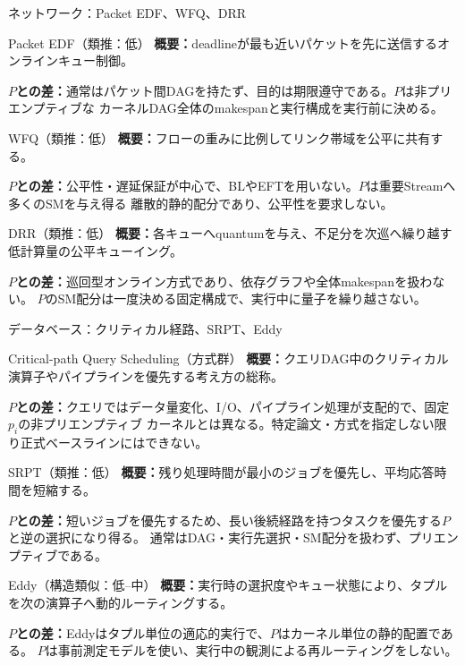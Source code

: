 \documentclass[aspectratio=169,10pt]{beamer}
\begin{document}
\begin{frame}{ネットワーク：Packet EDF、WFQ、DRR}
  \scriptsize
  \begin{block}{Packet EDF（類推：低）}
    \textbf{概要：}deadlineが最も近いパケットを先に送信するオンラインキュー制御。\par
    \textbf{$P$との差：}通常はパケット間DAGを持たず、目的は期限遵守である。$P$は非プリエンプティブな
    カーネルDAG全体のmakespanと実行構成を実行前に決める。
  \end{block}
  \begin{block}{WFQ（類推：低）}
    \textbf{概要：}フローの重みに比例してリンク帯域を公平に共有する。\par
    \textbf{$P$との差：}公平性・遅延保証が中心で、BLやEFTを用いない。$P$は重要Streamへ多くのSMを与え得る
    離散的静的配分であり、公平性を要求しない。
  \end{block}
  \begin{block}{DRR（類推：低）}
    \textbf{概要：}各キューへquantumを与え、不足分を次巡へ繰り越す低計算量の公平キューイング。\par
    \textbf{$P$との差：}巡回型オンライン方式であり、依存グラフや全体makespanを扱わない。
    $P$のSM配分は一度決める固定構成で、実行中に量子を繰り越さない。
  \end{block}
\end{frame}

\begin{frame}{データベース：クリティカル経路、SRPT、Eddy}
  \scriptsize
  \begin{block}{Critical-path Query Scheduling（方式群）}
    \textbf{概要：}クエリDAG中のクリティカル演算子やパイプラインを優先する考え方の総称。\par
    \textbf{$P$との差：}クエリではデータ量変化、I/O、パイプライン処理が支配的で、固定$p_i$の非プリエンプティブ
    カーネルとは異なる。特定論文・方式を指定しない限り正式ベースラインにはできない。
  \end{block}
  \begin{block}{SRPT（類推：低）}
    \textbf{概要：}残り処理時間が最小のジョブを優先し、平均応答時間を短縮する。\par
    \textbf{$P$との差：}短いジョブを優先するため、長い後続経路を持つタスクを優先する$P$と逆の選択になり得る。
    通常はDAG・実行先選択・SM配分を扱わず、プリエンプティブである。
  \end{block}
  \begin{block}{Eddy（構造類似：低--中）}
    \textbf{概要：}実行時の選択度やキュー状態により、タプルを次の演算子へ動的ルーティングする。\par
    \textbf{$P$との差：}Eddyはタプル単位の適応的実行で、$P$はカーネル単位の静的配置である。
    $P$は事前測定モデルを使い、実行中の観測による再ルーティングをしない。
  \end{block}
\end{frame}
\end{document}
